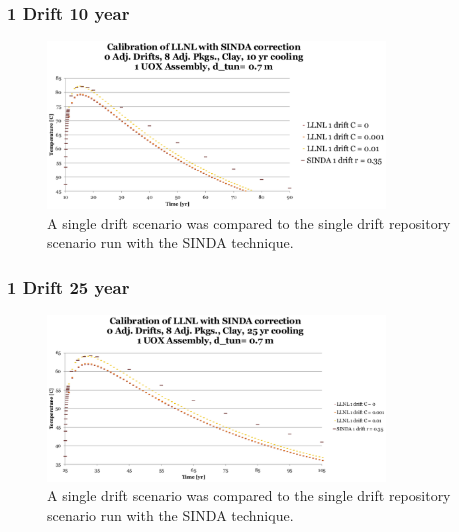 
\begin{frame}[ctb!]

  \frametitle{1 Drift 10 year}
  \begin{figure}[h!]
    \begin{center}
      \includegraphics[width=0.8\textwidth]{1drift10yr.eps}
    \end{center}
    \caption{A single drift scenario was compared to the single drift repository 
    scenario run with the SINDA technique.}
    \label{fig:1drift10yr}
  \end{figure}
  
\end{frame}

\begin{frame}[ctb!]

  \frametitle{1 Drift 25 year}
  \begin{figure}[h!]
    \begin{center}
      \includegraphics[width=0.8\textwidth]{1drift25yr.eps}
    \end{center}
    \caption{A single drift scenario was compared to the single drift repository 
    scenario run with the SINDA technique.}
    \label{fig:1drift10yr}
  \end{figure}
  
\end{frame}

